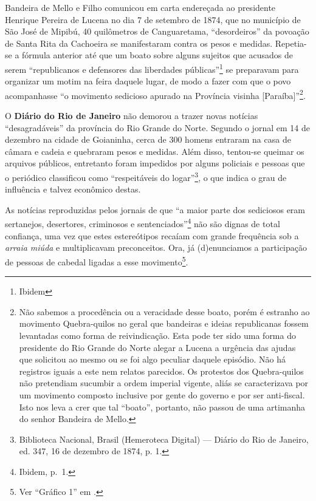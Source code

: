 \begin{refsection}
Bandeira de Mello e Filho comunicou em carta endereçada ao presidente Henrique Pereira de Lucena no dia 7 de setembro de 1874, que no município de São José de Mipibú, 40 quilômetros de Canguaretama, “desordeiros” da povoação de Santa Rita da Cachoeira se manifestaram contra os pesos e medidas. Repetia-se a fórmula anterior até que um boato sobre alguns sujeitos que acusados de serem “republicanos e defensores das liberdades públicas”\footnote{Ibidem} se preparavam para organizar um motim na feira daquele lugar, de modo a fazer com que o povo acompanhasse “o movimento sedicioso apurado na Província visinha [Paraíba]”\footnote{Não sabemos a procedência ou a veracidade desse boato, porém é estranho ao movimento Quebra-quilos no geral que bandeiras e ideias republicanas fossem levantadas como forma de reivindicação. Esta pode ter sido uma forma do presidente do Rio Grande do Norte alegar a Lucena a urgência das ajudas que solicitou ao mesmo ou se foi algo peculiar daquele episódio. Não há registros iguais a este nem relatos parecidos. Os protestos dos Quebra-quilos não pretendiam sucumbir a ordem imperial vigente, aliás se caracterizava por um movimento composto inclusive por gente do governo e por ser anti-fiscal. Isto nos leva a crer que tal “boato”, portanto, não passou de uma artimanha do senhor Bandeira de Mello.}.

O \textbf{Diário do Rio de Janeiro} não demorou a trazer novas notícias “desagradáveis” da província do Rio Grande do Norte. Segundo o jornal em 14 de dezembro na cidade de Goianinha, cerca de 300 homens entraram na casa de câmara e cadeia e quebraram pesos e medidas. Além disso, tentou-se queimar os arquivos públicos, entretanto foram impedidos por alguns policiais e pessoas que o periódico classificou como “respeitáveis do logar”\footnote{Biblioteca Nacional, Brasil (Hemeroteca Digital) --- Diário do Rio de Janeiro, ed. 347, 16 de dezembro de 1874, p. 1.}, o que indica o grau de influência e talvez econômico destas.

As notícias reproduzidas pelos jornais de que “a maior parte dos sediciosos eram sertanejos, desertores, criminosos e sentenciados”\footnote{Ibidem, p.~1.} não são dignas de total confiança, uma vez que estes estereótipos recaíam com grande frequência sob a \textit{arraia miúda} e multiplicavam preconceitos. Ora, já (d)enunciamos a participação de pessoas de cabedal ligadas a esse movimento\footnote{Ver ``Gráfico 1'' em .}.


\end{refsection}
